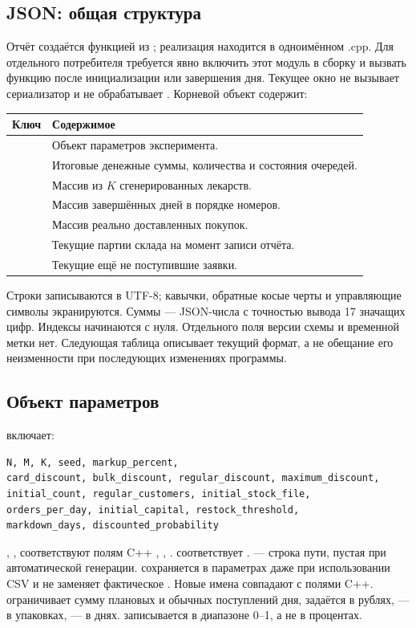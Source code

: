 \subsection{JSON: общая структура}
Отчёт создаётся функцией 
из ; реализация находится в одноимённом .cpp.
Для отдельного потребителя требуется явно включить этот модуль в сборку
и вызвать функцию после инициализации или завершения дня. Текущее окно
не вызывает сериализатор и не обрабатывает .
Корневой объект содержит:

\begin{tabularx}{\textwidth}{@{}L{0.28\textwidth}Y@{}}
\toprule
Ключ & Содержимое \\
\midrule
{} & Объект параметров эксперимента. \\
 & Итоговые денежные суммы, количества и состояния очередей. \\
 & Массив из $K$ сгенерированных лекарств. \\
 & Массив завершённых дней в порядке номеров. \\
 & Массив реально доставленных покупок. \\
 & Текущие партии склада на момент записи отчёта. \\
 & Текущие ещё не поступившие заявки. \\
\bottomrule
\end{tabularx}

Строки записываются в UTF-8; кавычки, обратные косые черты и управляющие
символы экранируются. Суммы --- JSON-числа с точностью вывода 17 значащих цифр.
Индексы начинаются с нуля. Отдельного поля версии схемы и временной метки нет.
Следующая таблица описывает текущий формат, а не обещание его неизменности
при последующих изменениях программы.

\subsection{Объект параметров}
 включает:
\begin{lstlisting}
N, M, K, seed, markup_percent,
card_discount, bulk_discount, regular_discount, maximum_discount,
initial_count, regular_customers, initial_stock_file,
orders_per_day, initial_capital, restock_threshold,
markdown_days, discounted_probability
\end{lstlisting}
, ,  соответствуют полям C++ ,
, .  соответствует
.  --- строка пути,
пустая при автоматической генерации.  сохраняется
в параметрах даже при использовании CSV и не заменяет фактическое
.
Новые имена совпадают с полями C++.  ограничивает
сумму плановых и обычных поступлений дня,  задаётся
в рублях,  --- в упаковках, 
--- в днях.  записывается в диапазоне 0--1,
а не в процентах.

